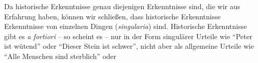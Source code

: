 \begin{comment}
Empfindungen werden von \authorcite{Wolff:Psychologiaempirica1968} nicht mit Erfahrungen identifiziert,
weswegen der Zusammenhang nicht ganz so klar ist, wie es zunächst scheint.
\enquote{Wir erfahren alles dasjenige, was wir erkennen, wenn wir auf unsere
Empfindungen acht haben.}\footnote{\cite[][5. Capitel,
\S~1]{Wolff:VernuenftigeGedankenvondenKraeftendesmenschlichenVerstandesundihremrichtigenGebraucheinErkenntnisderWahrheit1978}.
Siehe auch die Parallelstelle in der Lateinischen Logik, wo der Begriff der
Erfahrung (\enquote{experientia}) folgendermaßen eingeführt wird:
\enquote{\ori{Experiri} dicimur, quicquid ad perceptiones nostras attenti
cognoscimus. Ipsa vero horum cognitio, qu\ae{} sola attentione ad perceptiones
nostras patent,
\ori{experientia} vocatur}
\parencite[][\S~664]{Wolff:PhilosophiarationalissiveLogica1740}.} Natürlich
empfinden wir nicht, dass die Flamme das Papier anzündet, aber wir erfahren es,
wenn wir auf die entsprechenden Empfindungen achten (und nicht etwa auf den
Begriff der Flamme oder des Papiers), d.\,h.\ in kantischer Terminologie wenn
wir unser rezeptives (sinnliches) Erkenntnisvermögen gebrauchen. Erfahren und
Empfindungen haben ist nicht dasselbe, schon weil wir Dinge
empfinden\footnote{\cite[Vgl.][1. Capitel,
\S~1]{Wolff:VernuenftigeGedankenvondenKraeftendesmenschlichenVerstandesundihremrichtigenGebraucheinErkenntnisderWahrheit1978}:
\enquote{Ein jeder nimmet bey sich selbst wahr, daß er viele Dinge empfindet.
Ich sage aber, daß wir etwas empfinden, wenn wir uns desselben als uns
gegenwärtig bewust sind. So empfinden wir den Schmertz, den Schall, das Licht
und unsere eigene Gedancken.} Durch den zweiten Satz wird die Angabe, dass wir
Dinge empfinden, nicht widerrufen, sondern um weitere Objekte unseres
Empfindens ergänzt, wie aus \S~3 hervorgeht.}, aber Tatsachen erfahren. Was wir
empfinden, sind einzelne Gegenstände wie Gläser, Wasser und Tische bzw.\ die
Wirkungen auf unsere Sinnesorgane wie Licht oder Nässe. Was wir erfahren oder
wahrnehmen ist, dass das Wasser den Tisch nass macht.
\end{comment}
Da historische Erkenntnisse genau diejenigen Erkenntnisse sind, die wir aus
Erfahrung haben, können wir schließen, dass historische Erkenntnisse
Erkenntnisse von einzelnen Dingen (\emph{singularia}) sind. Historische
Erkenntnisse gibt es \emph{a fortiori} -- so scheint es -- nur in der Form
singulärer Urteile wie \enquote{Peter ist
wütend} oder  \enquote{Dieser Stein ist schwer}, nicht aber als
allgemeine Urteile wie \enquote{Alle Menschen sind sterblich} oder
